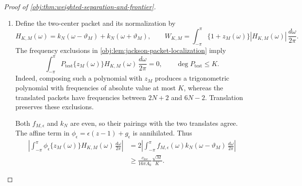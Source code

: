 \documentclass[11pt]{article}
\begin{document}
\begin{proof}[Proof of \cref{obj:thm:weighted-separation-and-frontier}]
\begin{enumerate}
To control the other kink, put
\[
\beta_M=\pi-\vartheta_M.
\]
Since \(M\ge2\), one has \(\vartheta_M\in[\pi/2,\pi)\), and hence
\[
\|2\vartheta_M\|_{\mathbb T}=2\beta_M,
\qquad
\cos\beta_M=1-\frac2M.
\]
The inequality \(1-\cos\beta_M\le\beta_M^2/2\) gives
\[
\beta_M\ge\frac2{\sqrt M},
\qquad
\|2\vartheta_M\|_{\mathbb T}\ge\frac4{\sqrt M}.
\]
Applying the localized bound for \(G_N\) gives, with
\[
C_{\mathrm{opp}}=\frac{C_{\mathrm{loc}}}{16},
\]
\[
|G_N(2\vartheta_M)|
\le
\frac{C_{\mathrm{loc}}}
     {N\{1+N\|2\vartheta_M\|_{\mathbb T}\}^2}
\le\frac{C_{\mathrm{opp}}M}{N^3}.
\]

Choose a universal integer \(A_0\) satisfying
\[
A_0>
\max\left\{
1,\frac{2C_{\mathrm{opp}}}{c_{\mathrm{loc}}},
\frac{32\pi C_{\mathrm{sm}}}{c_{\mathrm{loc}}}
\right\},
\qquad
N=A_0K.
\]
Then
\[
2C_{\mathrm{opp}}\le c_{\mathrm{loc}}A_0^2,
\qquad
32\pi C_{\mathrm{sm}}\le c_{\mathrm{loc}}A_0,
\]
so \(M\le K^2\) implies
\[
|G_N(2\vartheta_M)|\le\frac{c_{\mathrm{loc}}}{2N},
\qquad
|G_N(0)+G_N(2\vartheta_M)|
\ge\frac{c_{\mathrm{loc}}}{2N}.
\]
Also,
\[
\sqrt{M-1}\ge\frac{\sqrt M}{2},
\qquad
\frac{C_{\mathrm{sm}}M}{N^2}
\le\frac{c_{\mathrm{loc}}\sqrt M}{32\pi N}.
\]
The integration-by-parts identity consequently proves
\[
\left|
\int_{-\pi}^{\pi}
f_{M,\epsilon}(\omega)k_N(\omega-\vartheta_M)\,
\frac{d\omega}{2\pi}
\right|
\ge
\frac{c_{\mathrm{loc}}\sqrt M}{32\pi N}.
\]

\item
Define the two-center packet and its normalization by
\[
H_{K,M}(\omega)
=k_N(\omega-\vartheta_M)+k_N(\omega+\vartheta_M),
\qquad
W_{K,M}
=\int_{-\pi}^{\pi}
\{1+z_M(\omega)\}|H_{K,M}(\omega)|\,\frac{d\omega}{2\pi}.
\]
The frequency exclusions in
\cref{obj:lem:jackson-packet-localization} imply
\[
\int_{-\pi}^{\pi}
P_{\mathrm{test}}\{z_M(\omega)\}H_{K,M}(\omega)\,
\frac{d\omega}{2\pi}=0,
\qquad
\deg P_{\mathrm{test}}\le K.
\]
Indeed, composing such a polynomial with \(z_M\) produces a trigonometric polynomial with frequencies of absolute value at most \(K\), whereas the translated packets have frequencies between \(2N+2\) and \(6N-2\). Translation preserves these exclusions.

Both \(f_{M,\epsilon}\) and \(k_N\) are even, so their pairings with the two translates agree. The affine term in
\(\phi_\epsilon=\epsilon(z-1)+g_\epsilon\) is annihilated. Thus
\[
\begin{aligned}
\left|
\int_{-\pi}^{\pi}
\phi_\epsilon\{z_M(\omega)\}H_{K,M}(\omega)\,
\frac{d\omega}{2\pi}
\right|
&=
2\left|
\int_{-\pi}^{\pi}
f_{M,\epsilon}(\omega)k_N(\omega-\vartheta_M)\,
\frac{d\omega}{2\pi}
\right|\\
&\ge
\frac{c_{\mathrm{loc}}}{16\pi A_0}\frac{\sqrt M}{K}.
\end{aligned}
\]


\end{enumerate}
\end{proof}
\end{document}
